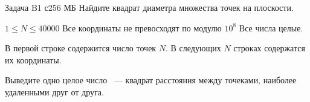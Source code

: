 \begin{problem}{Задача B}{1 с}{256 МБ}
Найдите квадрат диаметра множества точек на плоскости.

\Limit

$1 \le N \le 40000$
Все координаты не превосходят по модулю $10^8$
Все числа целые.

\InputFile
В первой строке содержится число точек $N$.
В следующих $N$ строках содержатся их координаты.

\OutputFile
Выведите одно целое число ~--- квадрат расстояния между
точеками, наиболее удаленными друг от друга.

\Example
\begin{example}
\end{example}
\end{problem}
